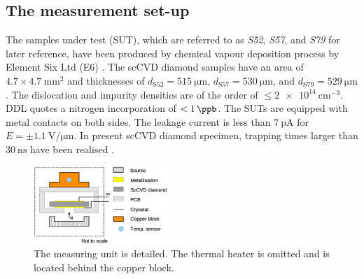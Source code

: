 \subsection{The measurement set-up}
The samples under test (SUT), which are referred to as \textit{S52}, \textit{S57}, and \textit{S79} for later reference, have been produced by chemical vapour deposition process
 by Element Six Ltd (E6) \cite{E6}.
The scCVD diamond samples have an area of $4.7 \times \SI{4.7}{\milli\meter^2}$
 and thicknesses of $d_{\textrm{S52}} = \SI{515}{\micro\meter}$, $d_{\textrm{S57}} = \SI{530}{\micro\meter}$, and $d_{\textrm{S79}} = \SI{529}{\micro\meter}$.
The dislocation and impurity densities are of the order of $\le \SI{2e14}{\centi\meter^{-3}}$. 
DDL quotes a nitrogen incorporation of $<\SI{1}{\ppb}$.
The SUTs are equipped with metal contacts on both sides. 
The leakage current is less than $\SI{7}{\pico\ampere}$ for $E = \pm \SI{1.1}{\volt/\micro\meter}$. 
In present scCVD diamond specimen, trapping times larger than $\SI{30}{\nano\second}$ have been realised \cite{pernegger:073704}. 

\begin{figure}[tb]
  \includegraphics[trim=0cm 1.5cm 0cm 0.5cm, clip=true,width=0.45\textwidth]{./figures/diamond_collimator4.eps}

  \caption{The measuring unit is detailed. The thermal heater is omitted and is located behind the copper block.}
  \label{fig:SETUPtct}
\end{figure} %

